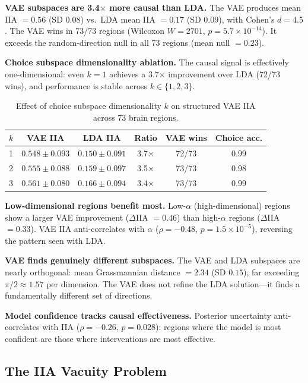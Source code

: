 \documentclass{article}
\begin{document}
\textbf{VAE subspaces are 3.4$\times$ more causal than LDA.} The VAE produces mean IIA $= 0.56$ (SD $0.08$) vs.\ LDA mean IIA $= 0.17$ (SD $0.09$), with Cohen's $d = 4.5$. The VAE wins in 73/73 regions (Wilcoxon $W = 2701$, $p = 5.7 \times 10^{-14}$). It exceeds the random-direction null in all 73 regions (mean null $= 0.23$).

\textbf{Choice subspace dimensionality ablation.} The causal signal is effectively one-dimensional: even $k = 1$ achieves a 3.7$\times$ improvement over LDA (72/73 wins), and performance is stable across $k \in \{1, 2, 3\}$.

\begin{table}[h]
\centering
\small
\caption{Effect of choice subspace dimensionality $k$ on structured VAE IIA across 73 brain regions.}
\label{tab:vae_k_ablation}
\begin{tabular}{lccccc}
\toprule
$k$ & VAE IIA & LDA IIA & Ratio & VAE wins & Choice acc. \\
\midrule
1 & $0.548 \pm 0.093$ & $0.150 \pm 0.091$ & 3.7$\times$ & 72/73 & 0.99 \\
2 & $0.555 \pm 0.088$ & $0.159 \pm 0.097$ & 3.5$\times$ & 73/73 & 0.98 \\
3 & $0.561 \pm 0.080$ & $0.166 \pm 0.094$ & 3.4$\times$ & 73/73 & 0.99 \\
\bottomrule
\end{tabular}
\end{table}

\textbf{Low-dimensional regions benefit most.} Low-$\alpha$ (high-dimensional) regions show a larger VAE improvement ($\Delta$IIA $= 0.46$) than high-$\alpha$ regions ($\Delta$IIA $= 0.33$). VAE IIA anti-correlates with $\alpha$ ($\rho = -0.48$, $p = 1.5 \times 10^{-5}$), reversing the pattern seen with LDA.

\textbf{VAE finds genuinely different subspaces.} The VAE and LDA subspaces are nearly orthogonal: mean Grassmannian distance $= 2.34$ (SD $0.15$), far exceeding $\pi/2 \approx 1.57$ per dimension. The VAE does not refine the LDA solution---it finds a fundamentally different set of directions.

\textbf{Model confidence tracks causal effectiveness.} Posterior uncertainty anti-correlates with IIA ($\rho = -0.26$, $p = 0.028$): regions where the model is most confident are those where interventions are most effective.

\subsection{The IIA Vacuity Problem}
\label{sec:vacuity}
\end{document}
